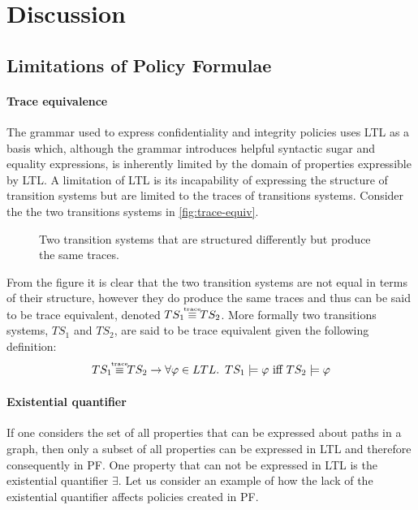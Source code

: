 \section{Discussion}\label{sec:discussion}
\subsection{Limitations of Policy Formulae}
\paragraph{Trace equivalence}
The grammar used to express confidentiality and integrity policies uses LTL as a basis which, although the grammar introduces helpful syntactic sugar and equality expressions, is inherently limited by the domain of properties expressible by LTL. A limitation of LTL is its incapability of expressing the structure of transition systems but are limited to the traces of transitions systems. Consider the the two transitions systems in \autoref{fig:trace-equiv}.
\begin{figure}[!ht]
    \centering
    
    \caption{Two transition systems that are structured differently but produce the same traces.}
    \label{fig:trace-equiv}
\end{figure}
From the figure it is clear that the two transition systems are not equal in terms of their structure, however they do produce the same traces and thus can be said to be trace equivalent, denoted $TS_1 \equivt TS_2$. More formally two transitions systems, $TS_1$ and $TS_2$, are said to be trace equivalent given the following definition:
\begin{align*}
    TS_1 \equivt TS_2 \rightarrow \forall \phi \in LTL .\enskip TS_1 \models \phi \text{ iff } TS_2 \models \phi
\end{align*}

\paragraph{Existential quantifier} If one considers the set of all properties that can be expressed about paths in a graph, then only a subset of all properties can be expressed in LTL and therefore consequently in PF. One property that can not be expressed in LTL is the existential quantifier $\exists$. Let us consider an example of how the lack of the existential quantifier affects policies created in PF.

